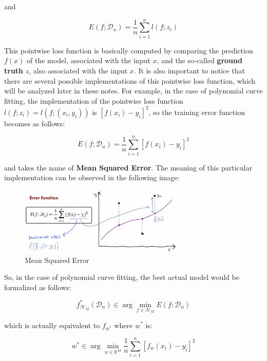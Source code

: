 and

\begin{equation*}
      E(f; \mathcal{D}_n) = \frac{1}{n} \sum_{i = 1}^{n} l(f;z_i)
\end{equation*}

This pointwise loss function is basically computed by comparing the prediction $f(x)$
of the model, associated with the input $x$, and the so-called \textbf{ground truth}
$z$, also associated with the input $x$. It is also important to notice that there are
several possible implementations of this pointwise loss function, which will be
analyzed later in these notes. For example, in the case of polynomial curve fitting,
the implementation of the pointwise loss function $l(f;z_i) = l(f;(x_i,y_i))$ is
$[f(x_i) - y_i]^2$, so the training error function becomes as follows:

\begin{equation*}
      E(f; \mathcal{D}_n) = \frac{1}{n} \sum_{i = 1}^{n} [f(x_i) - y_i]^2
\end{equation*}

and takes the name of \textbf{Mean Squared Error}. The meaning of this particular
implementation can be observed in the following image:

\newpage

\begin{figure}[h]
      \centering
      \includegraphics[width=0.7\textwidth]{../img/Mean_squared_error}
      \caption{Mean Squared Error}
\end{figure}

So, in the case of polynomial curve fitting, the best actual model would be
formalized as follows:

\begin{equation*}
      f_{\mathcal{H}_M}^*(\mathcal{D}_n) \in \arg \min_{f \in \mathcal{H}_M} E(f; \mathcal{D}_n)
\end{equation*}

which is actually equivalent to $f_{w^*}$ where $w^*$ is:

\begin{equation*}
      w^* \in \arg \min_{w \in \mathbb{R}^M} \frac{1}{n} \sum_{i = 1}^{n} [f_w(x_i) - y_i]^2
\end{equation*}

